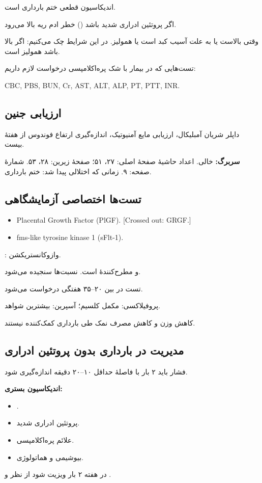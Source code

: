 \documentclass[12pt,a4paper]{article}
\begin{document}
اندیکاسیون قطعی ختم بارداری است.

اگر پروتئین ادراری شدید باشد () خطر ادم ریه بالا می‌رود.

وقتی  بالاست یا به علت آسیب کبد است یا همولیز. در این شرایط  چک می‌کنیم: اگر بالا باشد همولیز است.

تست‌هایی که در بیمار با شک پره‌اکلامپسی درخواست لازم داریم:
\begin{latin}CBC, PBS, BUN, Cr, AST, ALT, ALP, PT, PTT, INR.\end{latin}
\subsection*{ارزیابی جنین}
داپلر شریان آمبلیکال، ارزیابی مایع آمنیوتیک، اندازه‌گیری ارتفاع فوندوس از هفتهٔ بیست.

\textbf{سربرگ:}  خالی. اعداد حاشیهٔ صفحهٔ اصلی: ۲۷، ۵۱؛ صفحهٔ زیرین: ۲۸، ۵۳. شمارهٔ صفحه: ۹.
زمانی که اختلالی پیدا شد: ختم بارداری.
\subsection*{تست‌ها اختصاصی آزمایشگاهی}
\begin{latin}\begin{itemize}
\item Placental Growth Factor (PlGF). [Crossed out: GRGF.]
\item fms-like tyrosine kinase 1 (sFlt-1).
\end{itemize}\end{latin}
: وازوکانستریکشن.

 و  مطرح‌کنندهٔ  است. نسبت‌ها سنجیده می‌شود.

تست در بین ۲۰--۳۵ هفتگی درخواست می‌شود.

پروفیلاکسی: مکمل کلسیم؛ آسپرین: بیشترین شواهد.

کاهش وزن و کاهش مصرف نمک طی بارداری کمک‌کننده نیستند.
\subsection*{مدیریت  در بارداری بدون پروتئین ادراری}
فشار باید ۲ بار با فاصلهٔ حداقل ۱۰--۲۰ دقیقه اندازه‌گیری شود.

\textbf{اندیکاسیون بستری:}
\begin{itemize}
\item {}.
\item پروتئین ادراری شدید.
\item علائم پره‌اکلامپسی.
\item بیوشیمی و هماتولوژی.
\end{itemize}
در هفته ۲ بار ویزیت شود از نظر  و .
\end{document}
